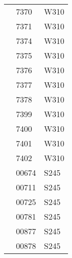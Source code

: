\documentclass{article}
\begin{document}
\begin{table}[!htbp]
\begin{tabular}{lll}
 & 7370 & W310 \\
 & 7371 & W310 \\
 & 7374 & W310 \\
 & 7375 & W310 \\
 & 7376 & W310 \\
 & 7377 & W310 \\
 & 7378 & W310 \\
 & 7399 & W310 \\
 & 7400 & W310 \\
 & 7401 & W310 \\
 & 7402 & W310 \\
 & 00674 & S245 \\
 & 00711 & S245 \\
 & 00725 & S245 \\
 & 00781 & S245 \\
 & 00877 & S245 \\
 & 00878 & S245 \\
\bottomrule
\end{tabular}
\end{table}
\end{document}
